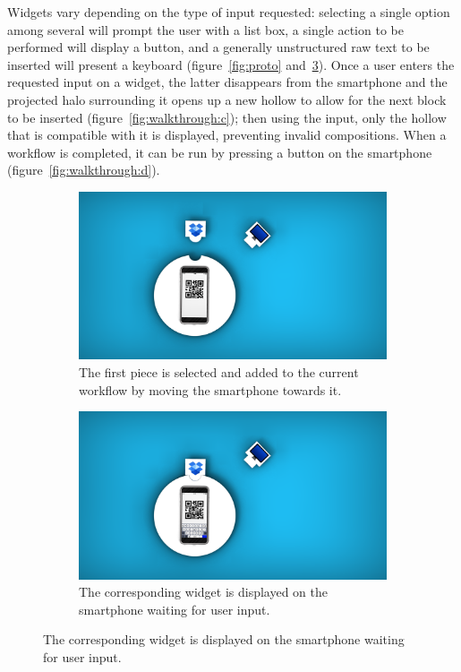 Widgets vary depending on the type of input requested: selecting a single option among several will prompt the user with a list box, a single action to be performed will display a button, and a generally unstructured raw text to be inserted will present a keyboard (figure~\ref{fig:proto} and~\ref{fig:walkthrough:b}). Once a user enters the requested input on a widget, the latter disappears from the smartphone and the projected halo surrounding it opens up a new hollow to allow for the next block to be inserted (figure~\ref{fig:walkthrough:c}); then using the input, only the hollow that is compatible with it is displayed, preventing invalid compositions. When a workflow is completed, it can be run by pressing a button on the smartphone (figure~\ref{fig:walkthrough:d}).

\begin{figure}[ht!] 
  \begin{subfigure}[b]{0.48\linewidth}
    \centering
    \includegraphics[width=0.75\linewidth,trim={800 200 1600 200},clip]{images/c4/TAPAS-1.png} 
    \caption{The first piece is se\-lect\-ed and add\-ed to the cur\-rent work\-flow by mov\-ing the smart\-phone to\-wards it.}\label{fig:walkthrough:a}
  \end{subfigure}\hfill
  \begin{subfigure}[b]{0.48\linewidth}
    \centering
    \includegraphics[width=0.75\linewidth,trim={800 200 1600 200},clip]{images/c4/TAPAS-2.png} 
    \caption{The cor\-re\-spond\-ing widg\-et is dis\-played on the smart\-phone wait\-ing for us\-er in\-put.}\label{fig:walkthrough:b}

\end{subfigure}
\end{figure}

